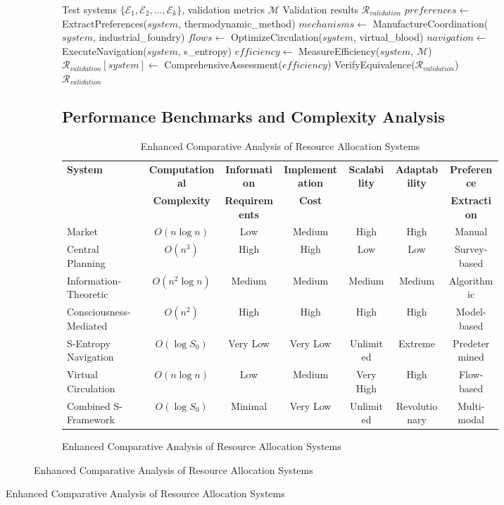 \documentclass[12pt,a4paper]{article}
\begin{document}
\begin{figure}[H]
\begin{figure}[H]
\begin{figure}[H]
\begin{algorithm}
\caption{Comprehensive Resource Allocation Validation Protocol}
\begin{algorithmic}[1]
\Require Test systems $\{\mathcal{E}_1, \mathcal{E}_2, \ldots, \mathcal{E}_k\}$, validation metrics $\mathcal{M}$
\Ensure Validation results $\mathcal{R}_{validation}$
    \State $preferences \leftarrow$ ExtractPreferences($system$, thermodynamic\_method)
    \State $mechanisms \leftarrow$ ManufactureCoordination($system$, industrial\_foundry)
    \State $flows \leftarrow$ OptimizeCirculation($system$, virtual\_blood)
    \State $navigation \leftarrow$ ExecuteNavigation($system$, s\_entropy)
    \State $efficiency \leftarrow$ MeasureEfficiency($system$, $\mathcal{M}$)
    \State $\mathcal{R}_{validation}[system] \leftarrow$ ComprehensiveAssessment($efficiency$)
\EndFor
\State VerifyEquivalence($\mathcal{R}_{validation}$)
\Return $\mathcal{R}_{validation}$
\end{algorithmic}
\end{algorithm}

\subsection{Performance Benchmarks and Complexity Analysis}

\begin{table}[H]
\centering
\caption{Enhanced Comparative Analysis of Resource Allocation Systems}
\begin{tabular}{@{}lcccccc@{}}
\toprule
\textbf{System} & \textbf{Computational} & \textbf{Information} & \textbf{Implementation} & \textbf{Scalability} & \textbf{Adaptability} & \textbf{Preference} \\
 & \textbf{Complexity} & \textbf{Requirements} & \textbf{Cost} &  &  & \textbf{Extraction} \\
\midrule
Market & $O(n \log n)$ & Low & Medium & High & High & Manual \\
Central Planning & $O(n^3)$ & High & High & Low & Low & Survey-based \\
Information-Theoretic & $O(n^2 \log n)$ & Medium & Medium & Medium & Medium & Algorithmic \\
Consciousness-Mediated & $O(n^2)$ & High & High & High & High & Model-based \\
S-Entropy Navigation & $O(\log S_0)$ & Very Low & Very Low & Unlimited & Extreme & Predetermined \\
Virtual Circulation & $O(n \log n)$ & Low & Medium & Very High & High & Flow-based \\
Combined S-Framework & $O(\log S_0)$ & Minimal & Very Low & Unlimited & Revolutionary & Multi-modal \\
\bottomrule
\end{tabular}
\end{table}


\end{figure}
\end{figure}
\end{figure}
\end{document}
